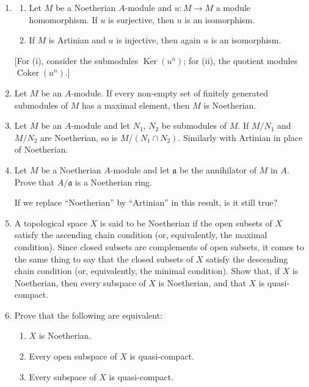 \begin{enumerate}
\item
\begin{enumerate}
\renewcommand{\labelenumii}{\roman{enumii})}
\item Let $M$ be a Noetherian $A$-module and $u:M\longrightarrow M$ a module homomorphism. If $u$ is surjective, then $u$ is an isomorphism.
\item If $M$ is Artinian and $u$ is injective, then again $u$ is an isomorphism.
\end{enumerate}
[For (i), consider the submodules $\operatorname{Ker}(u^n)$; for (ii), the quotient modules $\operatorname{Coker}(u^n)$.]

\item Let $M$ be an $A$-module. If every non-empty set of finitely generated submodules of $M$ has a maximal element, then $M$ is Noetherian.

\item Let $M$ be an $A$-module and let $N_1$, $N_2$ be submodules of $M$. If $M/N_1$ and $M/N_2$ are Noetherian, so is $M/(N_1\cap N_2)$. Similarly with Artinian in place of Noetherian.

\item Let $M$ be a Noetherian $A$-module and let $\mathfrak a$ be the annihilator of $M$ in $A$. Prove that $A/\mathfrak a$ is a Noetherian ring.

If we replace ``Noetherian'' by ``Artinian'' in this result, is it still true?

\item A topological space $X$ is said to be Noetherian if the open subsets of $X$ satisfy the ascending chain condition (or, equivalently, the maximal condition). Since closed subsets are complements of open subsets, it comes to the same thing to say that the closed subsets of $X$ satisfy the descending chain condition (or, equivalently, the minimal condition). Show that, if $X$ is Noetherian, then every subspace of $X$ is Noetherian, and that $X$ is quasi-compact.

\item Prove that the following are equivalent:
\begin{enumerate}
\renewcommand{\labelenumii}{\roman{enumii})}
\item $X$ is Noetherian.
\item Every open subspace of $X$ is quasi-compact.
\item Every subspace of $X$ is quasi-compact.
\end{enumerate}


\end{enumerate}
